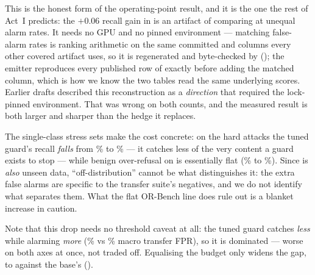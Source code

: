 This is the honest form of the operating-point result, and it is the one the rest of Act~I predicts: the
$+0.06$ recall gain in  is an artifact of comparing at unequal alarm rates. It needs
no GPU and no pinned environment --- matching false-alarm rates is ranking arithmetic on the same
committed  and  columns every other covered artifact uses, so it is
regenerated and byte-checked by  (); the emitter reproduces every
published row of  exactly before adding the matched column, which is how we know the
two tables read the same underlying scores. Earlier drafts described this reconstruction as a
\emph{direction} that required the lock-pinned environment. That was wrong on both counts, and the
measured result is both larger and sharper than the hedge it replaces.

The single-class stress sets make the cost concrete: on the hard
 attacks the tuned guard's recall \emph{falls} from \HarmBenchBaseRecallPct\% to
\HarmBenchSFTRecallPct\% --- it catches less of the very content a guard exists to stop --- while
benign over-refusal on  is essentially flat (\ORBenchBaseFPRPct\% to \ORBenchSFTFPRPct\%).
Since  is \emph{also} unseen data, ``off-distribution'' cannot be what distinguishes it:
the extra false alarms are specific to the transfer suite's negatives, and we do not identify what
separates them. What the flat OR-Bench line does rule out is a blanket increase in caution.

Note that this  drop needs no threshold caveat at all: the tuned guard catches
\emph{less} while alarming \emph{more} (\TransferSFTFPRPct\% vs \TransferBaseFPRPct\% macro transfer
FPR), so it is dominated --- worse on both axes at once, not traded off. Equalising the budget only
widens the gap, to \MatchedHarmSft{} against the base's \MatchedHarmBase{} ().

\begin{table}[htbp]\centering\small\setlength{\tabcolsep}{4.5pt}
\caption{Act I --- per-benchmark paired deltas (upper) and the calibration-targeted $5\%$ FPR operating
point plus single-class stress diagnostics (lower). Generated from the lock-bound scores.}
\label{tab:sensitivity}

\end{table}




